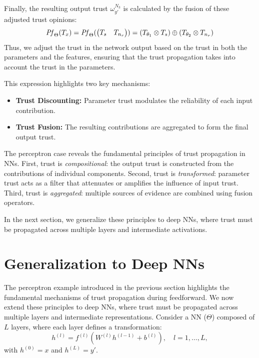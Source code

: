 Finally, the resulting output trust \(\omega_{y\prime}^{N_3}\) is calculated by the fusion of these adjusted trust opinions: 
\begin{equation}
\label{eq:sol}
    \mathit{Pf}_\Theta(T_x) = \mathit{Pf}_\Theta(\begin{pmatrix}
    T_s&T_{n_r}
\end{pmatrix}) =  (T_{\theta_1}\otimes T_s)\oplus (T_{\theta_2}\otimes T_{n_r})
\end{equation}
Thus, we adjust the trust in the network output based on the trust in both the parameters and the features, ensuring that the trust propagation takes into account the trust in the parameters.

This expression highlights two key mechanisms:
\begin{itemize}
    \item \textbf{Trust Discounting:} Parameter trust modulates the reliability of each input contribution.
    \item \textbf{Trust Fusion:} The resulting contributions are aggregated to form the final output trust.
\end{itemize}
\noindent The perceptron case reveals the fundamental principles of trust propagation in \acp{NN}. First, trust is \emph{compositional}: the output trust is constructed from the contributions of individual components. Second, trust is \emph{transformed}: parameter trust acts as a filter that attenuates or amplifies the influence of input trust. Third, trust is \emph{aggregated}: multiple sources of evidence are combined using fusion operators. 

In the next section, we generalize these principles to deep \acp{NN}, where trust must be propagated across multiple layers and intermediate activations.


\section{Generalization to Deep \acp{NN}}
\label{sec:dnn_trust}

The perceptron example introduced in the previous section highlights the fundamental mechanisms of trust propagation during feedforward. We now extend these principles to deep \acp{NN}, where trust must be propagated across multiple layers and intermediate representations. Consider a \ac{NN} ($\Theta$) composed of $L$ layers, where each layer defines a transformation:
\[
h^{(l)} = f^{(l)}\left(W^{(l)} h^{(l-1)} + b^{(l)}\right), \quad l = 1, \dots, L,
\]
with $h^{(0)} = x$ and $h^{(L)} = y'$.

